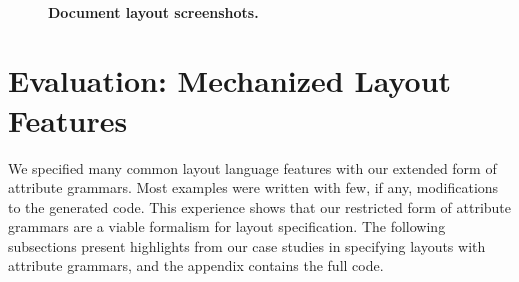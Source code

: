 \begin{figure}
\\
\caption{\textbf{Document layout screenshots.}}
\label{fig:docrenderings}
\end{figure}




\section{Evaluation: Mechanized Layout Features}
We specified many common layout language features with our extended form of attribute grammars. Most examples were written with few, if any, modifications to the generated code. This experience shows that our restricted form of attribute grammars are a viable formalism for layout specification. The following subsections present highlights from our case studies in specifying layouts with attribute grammars, and the appendix contains the full code.

